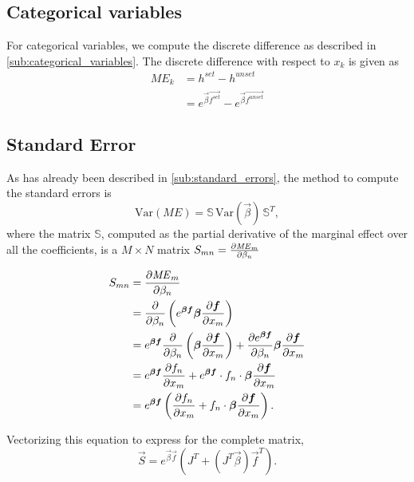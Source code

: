 \subsection{Categorical variables}

For categorical variables, we compute the discrete difference as described in
\ref{sub:categorical_variables}.
The discrete difference with respect to $x_k$ is given as
\begin{align*}
    \mathit{ME_k} &= h^{set} - h^{unset} \\
                  &= e^{\vec{\beta}\vec{f^{set}}} - e^{\vec{\beta}\vec{f^{unset}}}
\end{align*}

\subsection{Standard Error}

As has already been described in \ref{sub:standard_errors}, the method to compute
the standard errors is
\begin{equation}
    \mbox{Var}(ME) = \mathbb{S}\, \mbox{Var}(\vec{\beta})\,
    \mathbb{S}^T,
\end{equation}
where the matrix $\mathbb{S}$, computed as the partial derivative of
the marginal effect over all the coefficients, is a $M\times N$ matrix $S_{mn}
= \pder[\mathit{ME}_m]{\beta_n}$

\begin{align*}
    S_{mn} & = \pder[\mathit{ME}_m]{\beta_n} \\
           & = \pder{\beta_n} \left( e^{\vec{\beta} \vec{f}} \vec{\beta} \pder[\vec{f}]{x_m}  \right)\\
           & = e^{\vec{\beta} \vec{f}} \pder{\beta_n}\left(\vec{\beta} \pder[\vec{f}]{x_m} \right) +
                \pder[e^{\vec{\beta} \vec{f}}]{\beta_n} \vec{\beta} \pder[\vec{f}]{x_m} \\
           & = e^{\vec{\beta} \vec{f}} \pder[f_n]{x_m} +
                e^{\vec{\beta} \vec{f}} \cdot f_n \cdot \vec{\beta} \pder[\vec{f}]{x_m} \\
           & = e^{\vec{\beta} \vec{f}} \left( \pder[f_n]{x_m} +
                  f_n \cdot \vec{\beta} \pder[\vec{f}]{x_m} \right).
\end{align*}

Vectorizing this equation to express for the complete matrix,
\begin{equation*}
  \vec{S} = e^{\vec{\beta} \vec{f}} \left(J^T +
                (J^T \vec{\beta}) \vec{f}^T \right).
\end{equation*}
